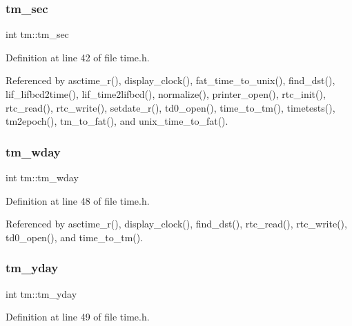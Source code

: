 \mbox{\label{structtm_a4d098a9a5c03a00b2ee61e10851de81e}} 
\subsubsection{\texorpdfstring{tm\+\_\+sec}{tm\_sec}}
{\footnotesize\ttfamily int tm\+::tm\+\_\+sec}



Definition at line 42 of file time.\+h.



Referenced by asctime\+\_\+r(), display\+\_\+clock(), fat\+\_\+time\+\_\+to\+\_\+unix(), find\+\_\+dst(), lif\+\_\+lifbcd2time(), lif\+\_\+time2lifbcd(), normalize(), printer\+\_\+open(), rtc\+\_\+init(), rtc\+\_\+read(), rtc\+\_\+write(), setdate\+\_\+r(), td0\+\_\+open(), time\+\_\+to\+\_\+tm(), timetests(), tm2epoch(), tm\+\_\+to\+\_\+fat(), and unix\+\_\+time\+\_\+to\+\_\+fat().

\mbox{\label{structtm_afe81a8c46f1c693c43f259b288859f4f}} 
\subsubsection{\texorpdfstring{tm\+\_\+wday}{tm\_wday}}
{\footnotesize\ttfamily int tm\+::tm\+\_\+wday}



Definition at line 48 of file time.\+h.



Referenced by asctime\+\_\+r(), display\+\_\+clock(), find\+\_\+dst(), rtc\+\_\+read(), rtc\+\_\+write(), td0\+\_\+open(), and time\+\_\+to\+\_\+tm().

\mbox{\label{structtm_a93a0ba77cc23796df84405dcbcc57eb1}} 
\subsubsection{\texorpdfstring{tm\+\_\+yday}{tm\_yday}}
{\footnotesize\ttfamily int tm\+::tm\+\_\+yday}



Definition at line 49 of file time.\+h.



